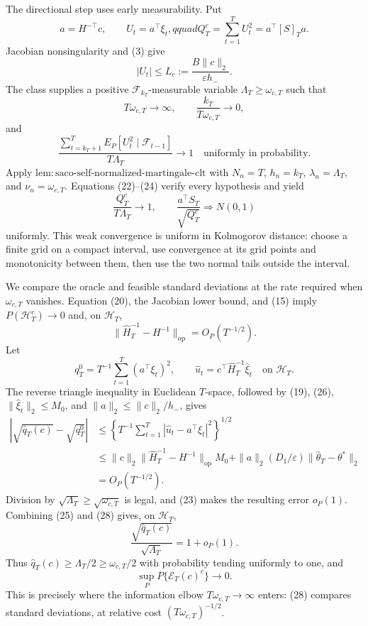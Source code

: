The directional step uses early measurability.  Put
\[
 a=H^{-\top}c,\qquad U_t=a^\top\xi_t,qquad
 Q_T^c=\sum_{t=1}^TU_t^2=a^\top[S]_Ta.
\tag{21}
\]
Jacobian nonsingularity and (3) give
\[
 |U_t|\le L_c:=\frac{B\|c\|_2}{\varepsilon h_-}.
\tag{22}
\]
The class supplies a positive \(\mathcal F_{k_T}\)-measurable variable
\(\Lambda_T\ge\omega_{c,T}\) such that
\[
 T\omega_{c,T}\longrightarrow\infty,
 \qquad \frac{k_T}{T\omega_{c,T}}\longrightarrow0,
\tag{23}
\]
and
\[
 \frac{\sum_{t=k_T+1}^TE_P[U_t^2\mid\mathcal F_{t-1}]}
 {T\Lambda_T}\longrightarrow1
 \quad\text{uniformly in probability}.
\tag{24}
\]
Apply \(\mathrm{lem:saco\text{-}self\text{-}normalized\text{-}martingale
\text{-}clt}\) with \(N_n=T\), \(h_n=k_T\),
\(\lambda_n=\Lambda_T\), and \(\nu_n=\omega_{c,T}\).  Equations
(22)--(24) verify every hypothesis and yield
\[
 \frac{Q_T^c}{T\Lambda_T}\longrightarrow1,
 \qquad \frac{a^\top S_T}{\sqrt{Q_T^c}}\Rightarrow N(0,1)
\tag{25}
\]
uniformly.  This weak convergence is uniform in Kolmogorov distance: choose a
finite grid on a compact interval, use convergence at its grid points and
monotonicity between them, then use the two normal tails outside the interval.

We compare the oracle and feasible standard deviations at the rate required
when \(\omega_{c,T}\) vanishes.  Equation (20), the Jacobian lower bound, and
(15) imply \(P(\mathcal H_T^c)\to0\) and, on \(\mathcal H_T\),
\[
 \|\widehat H_T^{-1}-H^{-1}\|_{\mathrm{op}}=O_P(T^{-1/2}).
\tag{26}
\]
Let
\[
 q_T^0=T^{-1}\sum_{t=1}^T(a^\top\xi_t)^2,
 \qquad \widehat u_t=c^\top\widehat H_T^{-1}\widehat\xi_t
 \quad\text{on }\mathcal H_T.
\tag{27}
\]
The reverse triangle inequality in Euclidean \(T\)-space, followed by
(19), (26), \(\|\widehat\xi_t\|_2\le M_0\), and
\(\|a\|_2\le\|c\|_2/h_-\), gives
\[
 \begin{aligned}
 \left|\sqrt{\widehat q_T(c)}-\sqrt{q_T^0}\right|
 &\le\left\{T^{-1}\sum_{t=1}^T
 |\widehat u_t-a^\top\xi_t|^2\right\}^{1/2}\\
 &\le \|c\|_2\|\widehat H_T^{-1}-H^{-1}\|_{\mathrm{op}}M_0
 +\|a\|_2(D_1/\varepsilon)\|\widehat\theta_T-\theta^*\|_2\\
 &=O_P(T^{-1/2}).
 \end{aligned}
\tag{28}
\]
Division by \(\sqrt{\Lambda_T}\ge\sqrt{\omega_{c,T}}\) is legal, and (23)
makes the resulting error \(o_P(1)\).  Combining (25) and (28) gives, on
\(\mathcal H_T\),
\[
 \frac{\sqrt{\widehat q_T(c)}}{\sqrt{\Lambda_T}}=1+o_P(1).
\tag{29}
\]
Thus \(\widehat q_T(c)\ge\Lambda_T/2\ge\omega_{c,T}/2\) with probability
tending uniformly to one, and
\[
 \sup_P P\{\mathcal E_T(c)^c\}\longrightarrow0.
\tag{30}
\]
This is precisely where the information elbow \(T\omega_{c,T}\to\infty\)
enters: (28) compares standard deviations, at relative cost
\((T\omega_{c,T})^{-1/2}\).

